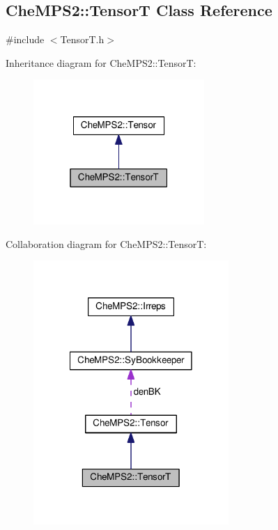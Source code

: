 \hypertarget{classCheMPS2_1_1TensorT}{\subsection{Che\-M\-P\-S2\-:\-:Tensor\-T Class Reference}
\label{classCheMPS2_1_1TensorT}
}


{\ttfamily \#include $<$Tensor\-T.\-h$>$}



Inheritance diagram for Che\-M\-P\-S2\-:\-:Tensor\-T\-:\nopagebreak
\begin{figure}[H]
\begin{center}
\leavevmode
\includegraphics[width=184pt]{classCheMPS2_1_1TensorT__inherit__graph}
\end{center}
\end{figure}


Collaboration diagram for Che\-M\-P\-S2\-:\-:Tensor\-T\-:\nopagebreak
\begin{figure}[H]
\begin{center}
\leavevmode
\includegraphics[width=210pt]{classCheMPS2_1_1TensorT__coll__graph}
\end{center}
\end{figure}
